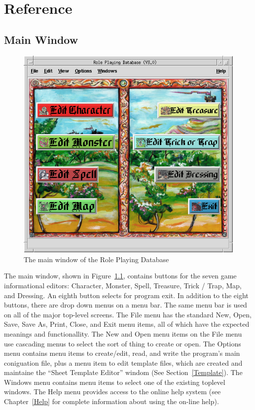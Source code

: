 \chapter{Reference}
\label{Reference}

\section{Main Window}
\label{Main}

\begin{figure}[hbpt]
\begin{centering}
\includegraphics[width=5in]{MainWindow.png}
\caption{The main window of the Role Playing Database}
\label{fig:main}
\end{centering}
\end{figure}
The main window, shown in Figure~\ref{fig:main}, contains buttons for
the seven game informational editors: Character, Monster, Spell,
Treasure, Trick / Trap, Map, and Dressing.  An eighth button selects
for program exit. In addition to the eight buttons, there are drop down
menus on a menu bar.  The same menu bar is used on all of the major
top-level screens.  The File menu has the standard New, Open, Save,
Save As, Print, Close, and Exit menu items, all of which have the
expected meanings and functionallity.  The New and Open menu items on
the File menu use cascading menus to select the sort of thing to create
or open.  The Options menu contains menu items to create/edit, read,
and write the program's main coniguation file, plus a menu item to edit
template files, which are created and maintaine the ``Sheet Template
Editor'' windom (See Section~\ref{Template}).  The Windows menu
contains menu items to select one of the existing toplevel windows. The
Help menu provides access to the online help system (see
Chapter~\ref{Help} for complete information about using the on-line help).

